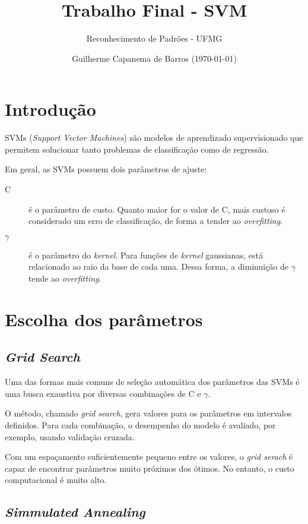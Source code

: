 \documentclass[a4paper]{article}
\title{Trabalho Final - SVM}
\author{Reconhecimento de Padrões - UFMG}
\date{\small{Guilherme Capanema de Barros (\today)}}
\begin{document}
\maketitle

\section{Introdução}

SVMs (\textit{Support Vector Machines}) são modelos de aprendizado supervisionado que permitem solucionar tanto problemas de classificação como de regressão.

Em geral, as SVMs possuem dois parâmetros de ajuste:

\begin{description}
	\item [C] é o parâmetro de custo. Quanto maior for o valor de C, mais custoso é considerado um erro de classificação, de forma a tender ao \textit{overfitting}.
	
	\item [$\gamma$] é o parâmetro do \textit{kernel}. Para funções de \textit{kernel} gaussianas, está relacionado ao raio da base de cada uma. Dessa forma, a diminuição de $\gamma$ tende ao \textit{overfitting}.

\end{description}
\section{Escolha dos parâmetros}


\subsection{\textit{Grid Search}}

Uma das formas mais comuns de seleção automática dos parâmetros das SVMs é uma busca exaustiva por diversas combinações de C e $\gamma$. 

O método, chamado \textit{grid search}, gera valores para os parâmetros em intervalos definidos. Para cada combinação, o desempenho do modelo é avaliado, por exemplo, usando validação cruzada.

Com um espaçamento suficientemente pequeno entre os valores, o \textit{grid serach} é capaz de encontrar parâmetros muito próximos dos ótimos. No entanto, o custo computacional é muito alto.

\subsection{\textit{Simmulated Annealing}}
\end{document}
